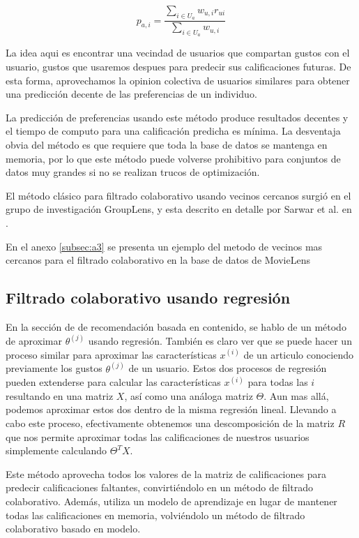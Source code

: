 \documentclass[11pt]{article}
\begin{document}
$$p_{a, i} = \frac {\sum\limits_{i\in U_a} w_{u, i}r_{ui}} {\sum\limits_{i\in U_a} w_{u, i}}$$

La idea aqui es encontrar una vecindad de usuarios que compartan gustos con el
usuario, gustos que usaremos despues para predecir sus calificaciones futuras.
De esta forma, aprovechamos la opinion colectiva de usuarios similares para
obtener una predicción decente de las preferencias de un individuo.

La predicción de preferencias usando este método produce resultados decentes y
el tiempo de computo para una calificación predicha es mínima. La desventaja
obvia del método es que requiere que toda la base de datos se mantenga en
memoria, por lo que este método puede volverse prohibitivo para conjuntos de
datos muy grandes si no se realizan trucos de optimización.

El método clásico para filtrado colaborativo usando vecinos cercanos surgió en
el grupo de investigación GroupLens, y esta descrito en detalle por Sarwar et al.
en \cite{itembased}.

En el anexo \ref{subsec:a3} se presenta un ejemplo del metodo de vecinos mas
cercanos para el filtrado colaborativo en la base de datos de MovieLens

\subsection{Filtrado colaborativo usando regresión}

En la sección de de recomendación basada en contenido, se hablo de un método de
aproximar $\theta^{(j)}$ usando regresión. También es claro ver que se puede
hacer un proceso similar para aproximar las características $x^{(i)}$ de un
articulo conociendo previamente los gustos  $\theta^{(j)}$ de un usuario. Estos
dos procesos de regresión pueden extenderse para calcular las características
$x^{(i)}$ para todas las $i$ resultando en una matriz $X$, así como una análoga
matriz $\Theta$. Aun mas allá, podemos aproximar estos dos dentro de la misma
regresión lineal. Llevando a cabo este proceso, efectivamente obtenemos una
descomposición de la matriz $R$ que nos permite aproximar todas las
calificaciones de nuestros usuarios simplemente calculando $\Theta^T X$.

Este método aprovecha todos los valores de la matriz de calificaciones para
predecir calificaciones faltantes, convirtiéndolo en un método de filtrado
colaborativo. Además, utiliza un modelo de aprendizaje en lugar de mantener
todas las calificaciones en memoria, volviéndolo un método de filtrado
colaborativo basado en modelo\cite{vucetic2005collaborative}.
\end{document}
